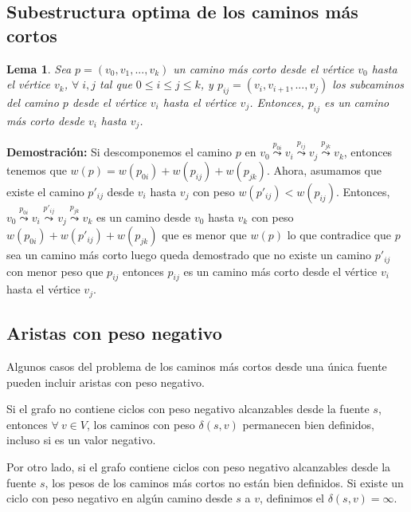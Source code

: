 \documentclass[12pt]{article}
\newcommand{\proof}{\textbf{Demostración:} }
\newcommand{\nl}{\vspace{0.3cm}}
\newtheorem{lemma}{Lema}
\begin{document}
\subsection{Subestructura optima de los caminos más cortos}

\nl

\begin{lemma} Sea $p = (v_0, v_1, ... , v_k)$ un camino más corto desde el vértice $v_0$ hasta el vértice $v_k$, $\forall \;i, j$ tal que $0 \leqslant i \leqslant j \leqslant k$, y $p_{ij} = (v_i, v_{i+1}, ..., v_j)$ los subcaminos del camino $p$ desde el vértice $v_i$ hasta el vértice $v_j$. Entonces, $p_{ij}$ es un camino más corto desde $v_i$ hasta $v_j$.
\end{lemma}

\proof Si descomponemos el camino $p$ en $v_0 \stackrel{p_{0i}}{\leadsto} v_i \stackrel{p_{ij}}{\leadsto} v_j \stackrel{p_{jk}}{\leadsto} v_k$, entonces tenemos que $w(p) = w(p_{0i}) + w(p_{ij}) + w(p_{jk})$. Ahora, asumamos que existe el camino $p'_{ij}$ desde $v_i$ hasta $v_j$ con peso $w(p'_{ij}) < w(p_{ij})$. Entonces, $v_0 \stackrel{p_{0i}}{\leadsto} v_i \stackrel{p'_{ij}}{\leadsto} v_j \stackrel{p_{jk}}{\leadsto} v_k$ es un camino desde $v_0$ hasta $v_k$ con peso $w(p_{0i}) + w(p'_{ij}) + w(p_{jk})$ que es menor que $w(p)$ lo que contradice que $p$ sea un camino más corto luego queda demostrado que no existe un camino $p'_{ij}$ con menor peso que $p_{ij}$ entonces $p_{ij}$ es un camino más corto desde el vértice $v_i$ hasta el vértice $v_j$.

\subsection{Aristas con peso negativo}

Algunos casos del problema de los caminos más cortos desde una única fuente pueden incluir aristas con peso negativo.

\nl

Si el grafo no contiene ciclos con peso negativo alcanzables desde la fuente $s$, entonces $\forall \ v \in V$, los caminos con peso $\delta(s, v)$ permanecen bien definidos, incluso si es un valor negativo.

\nl

Por otro lado, si el grafo contiene ciclos con peso negativo alcanzables desde la fuente $s$, los pesos de los caminos más cortos no están bien definidos. Si existe un ciclo con peso negativo en algún camino desde $s$ a $v$, definimos el $\delta(s, v) = \infty$.
\end{document}
